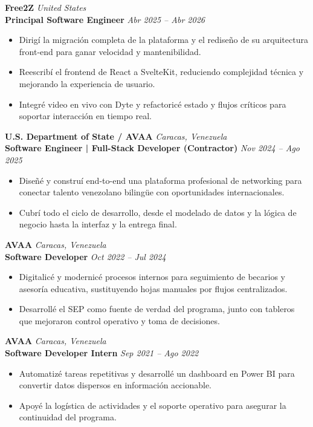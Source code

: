 \documentclass[10pt]{article}
\begin{document}
\vspace{4pt}

\textbf{Free2Z} \hfill \textit{United States} \\
\textbf{Principal Software Engineer} \hfill \textit{Abr 2025 – Abr 2026}
\begin{itemize}
    \item Dirigí la migración completa de la plataforma y el rediseño de su arquitectura front-end para ganar velocidad y mantenibilidad.
    \item Reescribí el frontend de React a SvelteKit, reduciendo complejidad técnica y mejorando la experiencia de usuario.
    \item Integré video en vivo con Dyte y refactoricé estado y flujos críticos para soportar interacción en tiempo real.
\end{itemize}

\vspace{4pt}

\textbf{U.S. Department of State / AVAA} \hfill \textit{Caracas, Venezuela} \\
\textbf{Software Engineer | Full-Stack Developer (Contractor)} \hfill \textit{Nov 2024 – Ago 2025}
\begin{itemize}
    \item Diseñé y construí end-to-end una plataforma profesional de networking para conectar talento venezolano bilingüe con oportunidades internacionales.
    \item Cubrí todo el ciclo de desarrollo, desde el modelado de datos y la lógica de negocio hasta la interfaz y la entrega final.
\end{itemize}

\textbf{AVAA} \hfill \textit{Caracas, Venezuela} \\
\textbf{Software Developer} \hfill \textit{Oct 2022 – Jul 2024}
\begin{itemize}
    \item Digitalicé y modernicé procesos internos para seguimiento de becarios y asesoría educativa, sustituyendo hojas manuales por flujos centralizados.
    \item Desarrollé el SEP como fuente de verdad del programa, junto con tableros que mejoraron control operativo y toma de decisiones.
\end{itemize}

\vspace{2pt}

\textbf{AVAA} \hfill \textit{Caracas, Venezuela} \\
\textbf{Software Developer Intern} \hfill \textit{Sep 2021 – Ago 2022}
\begin{itemize}
    \item Automatizé tareas repetitivas y desarrollé un dashboard en Power BI para convertir datos dispersos en información accionable.
    \item Apoyé la logística de actividades y el soporte operativo para asegurar la continuidad del programa.
\end{itemize}
\end{document}
